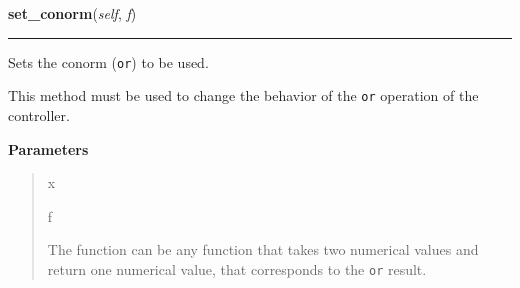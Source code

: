     \begin{boxedminipage}{\textwidth}

    \raggedright \textbf{set\_conorm}(\textit{self}, \textit{f})

    \vspace{-1.5ex}

    \rule{\textwidth}{0.5\fboxrule}

Sets the conorm (\texttt{or}) to be used.

This method must be used to change the behavior of the \texttt{or} operation
of the controller.
    \vspace{1ex}

      \textbf{Parameters}
      \begin{quote}
        \begin{Ventry}{x}

          \item[f]


The function can be any function that takes two numerical values and
return one numerical value, that corresponds to the \texttt{or} result.
        \end{Ventry}

      \end{quote}

    \vspace{1ex}

    \end{boxedminipage}

    \label{peach:fuzzy:control:Controller:set_negation}

    \vspace{0.5ex}

